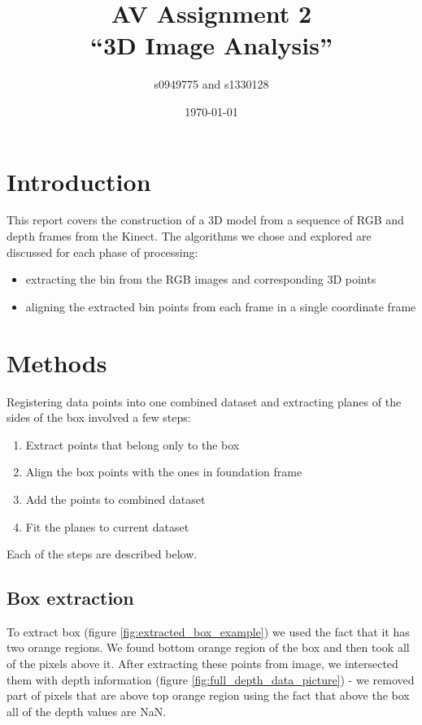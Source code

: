 \documentclass{article}
\begin{document}
\title{AV Assignment 2\\``3D Image Analysis''}
\author{s0949775 and s1330128}
\date{\today}
\maketitle


\section{Introduction}
This report covers the construction of a 3D model from a 
sequence of RGB and depth frames from the Kinect. 
The algorithms we chose and explored are discussed for
each phase of processing: 
\begin{itemize}
\item extracting the bin from the RGB images and corresponding 3D points
\item  aligning the extracted bin points from each frame in a single coordinate frame
\end{itemize}


\section{Methods}
Registering data points into one combined dataset and 
extracting planes of the sides of the box involved a few 
steps:

\begin{enumerate}
  \item Extract points that belong only to the box
  \item Align the box points with the ones in foundation frame
  \item Add the points to combined dataset
  \item Fit the planes to current dataset
\end{enumerate}

Each of the steps are described below.

\subsection{Box extraction}
To extract box (figure \ref{fig:extracted_box_example}) we used the fact that it has two orange regions.
We found bottom orange region of the box and then took all of the
pixels above it. After extracting these points from image, we 
intersected them with depth information (figure \ref{fig:full_depth_data_picture})
 - we removed part of
pixels that are above top orange region using the fact that above
the box all of the depth values are NaN.
\end{document}
